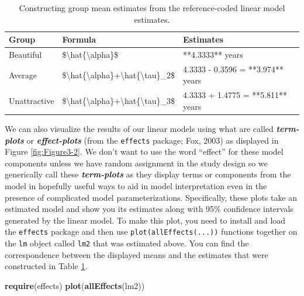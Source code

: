 \documentclass[]{book}
\newenvironment{Shaded}{\begin{snugshade}}{\end{snugshade}}
\newcommand{\KeywordTok}[1]{\textcolor[rgb]{0.13,0.29,0.53}{\textbf{#1}}}
\newcommand{\NormalTok}[1]{#1}
\begin{document}
\begin{table}

\caption{\label{tab:Table3-1}Constructing group mean estimates from the reference-coded
linear model estimates.}
\centering
\begin{tabular}[t]{l|l|l}
\hline
Group & Formula & Estimates\\
\hline
Beautiful & \$\textbackslash{}hat\{\textbackslash{}alpha\}\$ & **4.3333** years\\
\hline
Average & \$\textbackslash{}hat\{\textbackslash{}alpha\}+\textbackslash{}hat\{\textbackslash{}tau\}\_2\$ & 4.3333 - 0.3596 = **3.974** years\\
\hline
Unattractive & \$\textbackslash{}hat\{\textbackslash{}alpha\}+\textbackslash{}hat\{\textbackslash{}tau\}\_3\$ & 4.3333 + 1.4775 = **5.811** years\\
\hline
\end{tabular}
\end{table}

We can also visualize the results of our linear models using what are
called \textbf{\emph{term-plots}} or \textbf{\emph{effect-plots}} (from
the \texttt{effects} package; Fox, 2003) as displayed in Figure
\ref{fig:Figure3-2}. We don't want to use the word ``effect'' for these
model components unless we have random assignment in the study design so
we generically call these \textbf{\emph{term-plots}} as they display
terms or components from the model in hopefully useful ways to aid in
model interpretation even in the presence of complicated model
parameterizations. Specifically, these plots take an estimated model and
show you its estimates along with 95\% confidence intervals generated by
the linear model. To make this plot, you need to install and load the
\texttt{effects} package and then use \texttt{plot(allEffects(...))}
functions together on the \texttt{lm} object called \texttt{lm2} that
was estimated above. You can find the correspondence between the
displayed means and the estimates that were constructed in Table
\ref{tab:Table3-1}.




\begin{Shaded}
\begin{Highlighting}[]
\KeywordTok{require}\NormalTok{(effects)}
\KeywordTok{plot}\NormalTok{(}\KeywordTok{allEffects}\NormalTok{(lm2))}
\end{Highlighting}
\end{Shaded}
\end{document}
